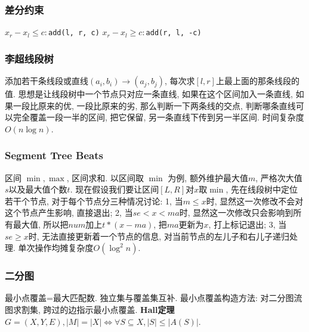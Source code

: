 \subsubsection{差分约束}
$x_r - x_l \leq c:$\texttt{add(l, r, c)}
$x_r - x_l \geq c:$\texttt{add(r, l, -c)}
\begin{comment}
\subsubsection{斯坦纳树}\
		在一个无向带权图$G=(V,E)$中, 将指定的$k$个点连通的一颗树称为\textbf{斯坦纳树}, 边权总和最小的斯坦纳树称为最小斯坦纳树. 
		\par 我们可以用DP+SPFA的方法求解斯坦纳树. 用$F_{i,state}$表示以$i$为根, 指定集合中的点的联通状态为$state$的生成树的最小总权值, 有两种转移方程. 
		\par 第一种, 通过两个子集合并进行转移, 即$F_{i,state}=min(F_{i,subset1} + F_{i,subset2})$, 这一部分使用DP完成. 
		\par 第二种, 在当前的联通状态下, 对该联通状态进行松弛操作, 即${F_{i,state}=min(F_{i,state},F_{j,state}+w(i,j))}$, 这一部分使用SPFA完成. 
        \par 时间复杂度$O(V*3^k+cE*2^k)$, $c$为SPFA复杂度中的常数. 
\end{comment}
\subsubsection{李超线段树}
        添加若干条线段或直线$(a_i,b_i)\to (a_j,b_j)$, 每次求$[l,r]$上最上面的那条线段的值. 思想是让线段树中一个节点只对应一条直线, 如果在这个区间加入一条直线, 如果一段比原来的优, 一段比原来的劣, 那么判断一下两条线的交点, 判断哪条直线可以完全覆盖一段一半的区间, 把它保留, 另一条直线下传到另一半区间. 时间复杂度$O(n \log n)$. 
\subsubsection{Segment Tree Beats}
        区间 $\min, \max$, 区间求和. 以区间取 $\min$ 为例, 额外维护最大值$m$, 严格次大值$s$以及最大值个数$t$. 现在假设我们要让区间$[L,R]$对$x$取$\min$, 先在线段树中定位若干个节点, 对于每个节点分三种情况讨论: 1, 当$m\leq x$时, 显然这一次修改不会对这个节点产生影响, 直接退出; 2, 当$se<x<ma$时, 显然这一次修改只会影响到所有最大值, 所以把$num$加上$t*(x-ma)$, 把$ma$更新为$x$, 打上标记退出; 3, 当$se\geq x$时, 无法直接更新着一个节点的信息, 对当前节点的左儿子和右儿子递归处理. 单次操作均摊复杂度$O(\log^2n)$. 

\subsubsection{二分图}
        最小点覆盖=最大匹配数. 独立集与覆盖集互补. 最小点覆盖构造方法: 对二分图流图求割集, 跨过的边指示最小点覆盖.
        \textbf{Hall定理}$G=(X,Y,E), |M|=|X| \Leftrightarrow \forall S \subseteq X, |S| \leq |A(S)|$. 

